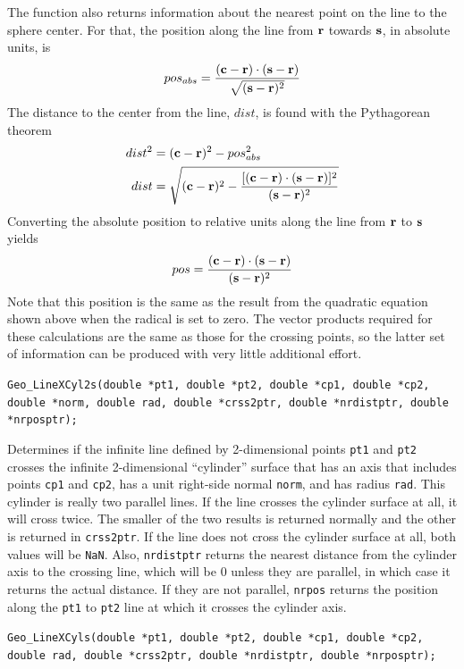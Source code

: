 \documentclass[11pt]{article}
\newcommand {\ttt} {\texttt}
\begin{document}
\begin{description}
The function also returns information about the nearest point on the line to the sphere center. For that, the position along the line from $\vb{r}$ towards $\vb{s}$, in absolute units, is
$$pos_{abs} = \frac{(\vb{c}-\vb{r})\cdot (\vb{s}-\vb{r})}{\sqrt{(\vb{s}-\vb{r})^2}}$$
The distance to the center from the line, $dist$, is found with the Pythagorean theorem
\begin{align*}
dist^2 &= (\vb{c}-\vb{r})^2 - pos_{abs}^2 \\
dist &= \sqrt{(\vb{c}-\vb{r})^2 - \frac{[(\vb{c}-\vb{r})\cdot (\vb{s}-\vb{r})]^2}{(\vb{s}-\vb{r})^2}}
\end{align*}
Converting the absolute position to relative units along the line from $\vb{r}$ to $\vb{s}$ yields
$$pos = \frac{(\vb{c}-\vb{r})\cdot (\vb{s}-\vb{r})}{(\vb{s}-\vb{r})^2}$$
Note that this position is the same as the result from the quadratic equation shown above when the radical is set to zero. The vector products required for these calculations are the same as those for the crossing points, so the latter set of information can be produced with very little additional effort.

\item[\ttt{double}]
\ttt{Geo\_LineXCyl2s(double *pt1, double *pt2, double *cp1, double *cp2, double *norm, double rad, double *crss2ptr, double *nrdistptr, double *nrposptr);}

Determines if the infinite line defined by 2-dimensional points \ttt{pt1} and \ttt{pt2} crosses the infinite 2-dimensional ``cylinder'' surface that has an axis that includes points \ttt{cp1} and \ttt{cp2}, has a unit right-side normal \ttt{norm}, and has radius \ttt{rad}. This cylinder is really two parallel lines. If the line crosses the cylinder surface at all, it will cross twice. The smaller of the two results is returned normally and the other is returned in \ttt{crss2ptr}. If the line does not cross the cylinder surface at all, both values will be \ttt{NaN}. Also, \ttt{nrdistptr} returns the nearest distance from the cylinder axis to the crossing line, which will be 0 unless they are parallel, in which case it returns the actual distance. If they are not parallel, \ttt{nrpos} returns the position along the \ttt{pt1} to \ttt{pt2} line at which it crosses the cylinder axis.

\item[{double}]
\ttt{Geo\_LineXCyls(double *pt1, double *pt2, double *cp1, double *cp2, double rad, double *crss2ptr, double *nrdistptr, double *nrposptr);}


\end{description}
\end{document}
